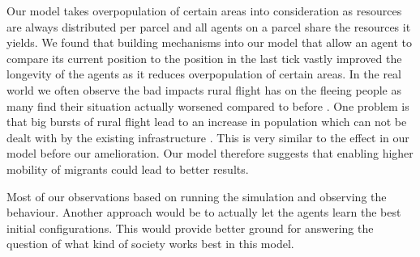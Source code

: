 \documentclass{JASSS}
\begin{document}
Our model takes overpopulation of certain areas into consideration as resources are always distributed per parcel and all agents on a parcel share the resources it yields. We found that building mechanisms into our model that allow an agent to compare its current position to the position in the last tick vastly improved the longevity of the agents as it reduces overpopulation of certain areas. In the real world we often observe the bad impacts rural flight has on the fleeing people as many find their situation actually worsened compared to before \citep{weeks}. One problem is that big bursts of rural flight lead to an increase in population which can not be dealt with by the existing infrastructure \citep{harris}. This is very similar to the effect in our model before our amelioration. Our model therefore suggests that enabling higher mobility of migrants could lead to better results.

Most of our observations based on running the simulation and observing the behaviour. Another approach would be to actually let the agents learn the best initial configurations. This would provide better ground for answering the question of what kind of society works best in this model. 










\endparano
\end{document}
